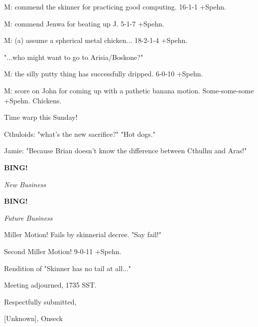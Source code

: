 \documentclass[12pt]{article}
\newcommand{\bing}{{\bf BING!} }
\newcommand{\goto}[1]{\bing \vskip 12pt \centerline{{\em{#1}}}}
\begin{document}
M: commend the skinner for practicing good computing. 16-1-1 +Spehn.

M: commend Jenwa for beating up J. 5-1-7 +Spehn.

M: (a) assume a spherical metal chicken... 18-2-1-4 +Spehn.

"...who might want to go to Arisia/Boskone?"

M: the silly putty thing has successfully dripped. 6-0-10 +Spehn.

M: score on John for coming up with a pathetic banana motion. Some-some-some +Spehn. Chickens.

Time warp this Sunday!

Cthuloids: "what's the new sacrifice?" "Hot dogs."

Jamie: "Because Brian doesn't know the difference between Cthulhu and Aras!"

\goto{New Business}

\goto{Future Business}

Miller Motion! Fails by skinnerial decree. "Say fail!"

Second Miller Motion! 9-0-11 +Spehn.

Rendition of "Skinner has no tail at all..."

\vspace{12pt}

\noindent
Meeting adjourned, 1735 SST.

\vspace{18pt}

\centerline{Respectfully submitted,}
\centerline{[Unknown], Onseck}
\end{document}
